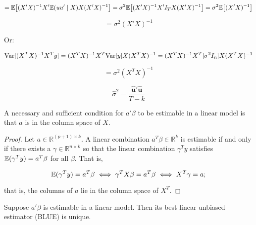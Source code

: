 \[
=\mathbb{E} \big[ (X'X)^{-1}X' \mathbb{E}(uu' \mid X)X(X'X)^{-1} \big] = \sigma^2 \mathbb{E} \big[ (X'X)^{-1}X' I_T X(X'X)^{-1} \big] = \sigma^2 \mathbb{E} \big[ (X'X)^{-1} \big]
\]

\[
= \sigma^2  (X'X)^{-1} 
\]

Or:

\[
\mathrm{Var} [ (X^TX)^{-1}X^Ty ] = (X^TX)^{-1}X^T \mathrm{Var}[ y ]  X(X^TX)^{-1}= (X^TX)^{-1}X^T [\sigma^2 I_n ]  X(X^TX)^{-1}
\]

\[
= \sigma^2 (X^TX)^{-1}
\]

\[
\hat{\sigma}^2 = \frac{ \hat{\boldsymbol{u}}'  \hat{\boldsymbol{u}}}{T - k}
\]

\begin{proposition}

A necessary and sufficient condition for \(a'\beta\) to be estimable in a linear model is that \(a\) is in the column space of \(X\).

\end{proposition}

\begin{proof}

Let \(a \in \mathbb{R}^{(p + 1) \times k}\). A linear combination \(a^T\beta \in \mathbb{R}^k\) is estimable if and only if there exists a \(\gamma \in \mathbb{R}^{n \times k}\) so that the linear combination \(\gamma^Ty\) satisfies \(\mathbb{E}( \gamma^T y) = a^T \beta\) for all \(\beta\). That is,

\[
\mathbb{E}( \gamma^T y) = a^T \beta \iff \gamma^T X \beta = a^T \beta \iff  X^T \gamma = a;
\]

that is, the columns of \(a\) lie in the column space of \(X^T\).

\end{proof}

\begin{proposition}

Suppose \(a ' \beta\) is estimable in a linear model. Then its best linear unbiased estimator (BLUE) is unique.

\end{proposition}

